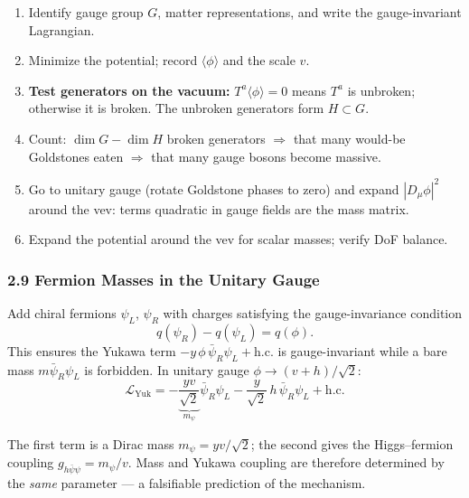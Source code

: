 \documentclass[12pt,a4paper]{article}
\newcommand{\Lag}{\mathcal{L}}
\begin{document}
\begin{enumerate}
  \item Identify gauge group $G$, matter representations, and write the gauge-invariant Lagrangian.
  \item Minimize the potential; record $\langle\phi\rangle$ and the scale $v$.
  \item \textbf{Test generators on the vacuum:} $T^a\langle\phi\rangle = 0$ means $T^a$ is unbroken; otherwise it is broken. The unbroken generators form $H \subset G$.
  \item Count: $\dim G - \dim H$ broken generators $\Rightarrow$ that many would-be Goldstones eaten $\Rightarrow$ that many gauge bosons become massive.
  \item Go to unitary gauge (rotate Goldstone phases to zero) and expand $|D_\mu\phi|^2$ around the vev: terms quadratic in gauge fields are the mass matrix.
  \item Expand the potential around the vev for scalar masses; verify DoF balance.
\end{enumerate}

\subsubsection*{2.9 \quad Fermion Masses in the Unitary Gauge}

Add chiral fermions $\psi_L$, $\psi_R$ with charges satisfying the gauge-invariance condition
\begin{equation}
  q(\psi_R) - q(\psi_L) = q(\phi) .
  \label{eq:sg:charge_cond}
\end{equation}
This ensures the Yukawa term $-y\,\phi\,\bar\psi_R\psi_L + \text{h.c.}$ is gauge-invariant while a bare mass $m\bar\psi_R\psi_L$ is forbidden. In unitary gauge $\phi \to (v+h)/\sqrt{2}$:
\begin{equation}
  \boxed{\;
  \Lag_{\mathrm{Yuk}} = -\underbrace{\frac{yv}{\sqrt{2}}}_{m_\psi}\bar\psi_R\psi_L
                      - \frac{y}{\sqrt{2}}\,h\,\bar\psi_R\psi_L + \text{h.c.}
  \;}
  \label{eq:sg:yukawa_unitary}
\end{equation}

The first term is a Dirac mass $m_\psi = yv/\sqrt{2}$; the second gives the Higgs–fermion coupling $g_{h\bar\psi\psi} = m_\psi/v$. Mass and Yukawa coupling are therefore determined by the \emph{same} parameter — a falsifiable prediction of the mechanism.

\end{document}
